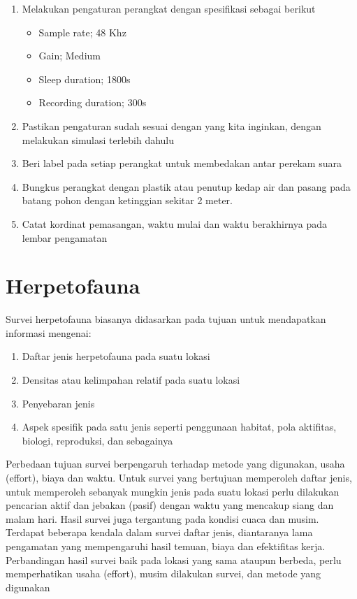 \documentclass[
]{book}
\providecommand{\tightlist}{%
  \setlength{\itemsep}{0pt}\setlength{\parskip}{0pt}}
\begin{document}
\begin{enumerate}
\def\labelenumi{\arabic{enumi}.}
\item
  Melakukan pengaturan perangkat dengan spesifikasi sebagai berikut

  \begin{itemize}
  \tightlist
  \item
    Sample rate; 48 Khz
  \item
    Gain; Medium
  \item
    Sleep duration; 1800s
  \item
    Recording duration; 300s
  \end{itemize}
\item
  Pastikan pengaturan sudah sesuai dengan yang kita inginkan, dengan melakukan simulasi terlebih dahulu
\item
  Beri label pada setiap perangkat untuk membedakan antar perekam suara
\item
  Bungkus perangkat dengan plastik atau penutup kedap air dan pasang pada batang pohon dengan ketinggian sekitar 2 meter.
\item
  Catat kordinat pemasangan, waktu mulai dan waktu berakhirnya pada lembar pengamatan
\end{enumerate}

\hypertarget{herpetofauna}{%
\section*{Herpetofauna}\label{herpetofauna}}

Survei herpetofauna biasanya didasarkan pada tujuan untuk mendapatkan informasi mengenai:

\begin{enumerate}
\def\labelenumi{\arabic{enumi}.}
\tightlist
\item
  Daftar jenis herpetofauna pada suatu lokasi
\item
  Densitas atau kelimpahan relatif pada suatu lokasi
\item
  Penyebaran jenis
\item
  Aspek spesifik pada satu jenis seperti penggunaan habitat, pola aktifitas, biologi, reproduksi, dan sebagainya
\end{enumerate}

Perbedaan tujuan survei berpengaruh terhadap metode yang digunakan, usaha (effort), biaya dan waktu. Untuk survei yang bertujuan memperoleh daftar jenis, untuk memperoleh sebanyak mungkin jenis pada suatu lokasi perlu dilakukan pencarian aktif dan jebakan (pasif) dengan waktu yang mencakup siang dan malam hari. Hasil survei juga tergantung pada kondisi cuaca dan musim. Terdapat beberapa kendala dalam survei daftar jenis, diantaranya lama pengamatan yang mempengaruhi hasil temuan, biaya dan efektifitas kerja. Perbandingan hasil survei baik pada lokasi yang sama ataupun berbeda, perlu memperhatikan usaha (effort), musim dilakukan survei, dan metode yang digunakan
\end{document}

